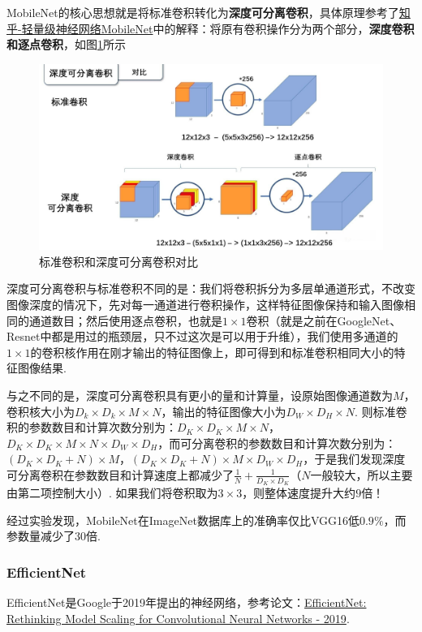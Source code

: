 \documentclass[12pt, a4paper, oneside]{ctexart}
\numberwithin{equation}{section}  %
\def\add{\vspace{1ex}}      %
\begin{document}
MobileNet的核心思想就是将标准卷积转化为\textbf{深度可分离卷积}，具体原理参考了\href{https://zhuanlan.zhihu.com/p/70703846}{知乎-轻量级神经网络MobileNet}中的解释：将原有卷积操作分为两个部分，\textbf{深度卷积和逐点卷积}，如图\ref{fig-MobileNet}所示
\begin{figure}[htbp]
  \centering
  \includegraphics[scale=0.4]{深度可分离卷积.jpg}
  \caption{标准卷积和深度可分离卷积对比}
  \label{fig-MobileNet}
\end{figure}

深度可分离卷积与标准卷积不同的是：我们将卷积拆分为多层单通道形式，不改变图像深度的情况下，先对每一通道进行卷积操作，这样特征图像保持和输入图像相同的通道数目；然后使用逐点卷积，也就是$1\times 1$卷积（就是之前在GoogleNet、Resnet中都是用过的瓶颈层，只不过这次是可以用于升维），我们使用多通道的$1\times 1$的卷积核作用在刚才输出的特征图像上，即可得到和标准卷积相同大小的特征图像结果.

与之不同的是，深度可分离卷积具有更小的量和计算量，设原始图像通道数为$M$，卷积核大小为$D_k\times D_k\times M\times N$，输出的特征图像大小为$D_W\times D_H\times N$. 则标准卷积的参数数目和计算次数分别为：$D_K\times D_K\times M\times N$，$D_K\times D_K\times M\times N\times D_W\times D_H$，而可分离卷积的参数数目和计算次数分别为：\add $(D_K\times D_K+N)\times M$，$(D_K\times D_K+N)\times M\times D_W\times D_H$，\add 于是我们发现深度可分离卷积在参数数目和计算速度上都减少了$\frac{1}{N}+\frac{1}{D_K\times D_K}$（$N$一般较大，所以主要由第二项控制大小）. 如果我们将卷积取为$3\times 3$，则整体速度提升大约$9$倍！

经过实验发现，MobileNet在ImageNet数据库上的准确率仅比VGG16低$0.9\%$，而参数量减少了$30$倍.

\subsubsection{EfficientNet}
EfficientNet是Google于2019年提出的神经网络，参考论文：\href{https://arxiv.org/pdf/1905.11946v5.pdf}{EfficientNet: Rethinking Model Scaling for Convolutional Neural Networks - 2019}.
\end{document}
